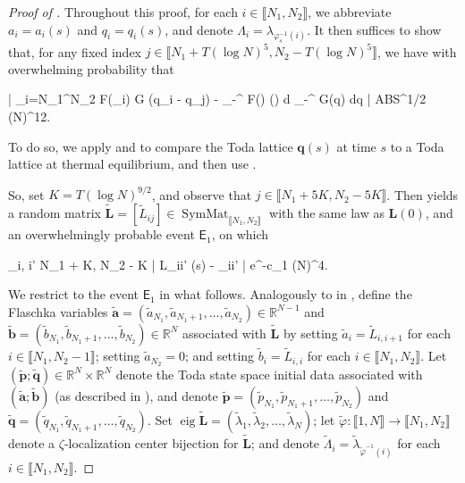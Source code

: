 \documentclass{amsart}
\numberwithin{equation}{section}
\DeclareMathOperator{\eig}{eig}
\DeclareMathOperator{\SymMat}{SymMat}
\theoremstyle{remark}
\theoremstyle{definition}
\begin{document}
	
	\begin{proof}[Proof of ]
		
		Throughout this proof, for each $i \in \llbracket N_1, N_2 \rrbracket$, we abbreviate $a_i = a_i (s)$ and $q_i = q_i (s)$, and denote $\Lambda_i = \lambda_{\varphi_s^{-1} (i)}$. It then suffices to show that, for any fixed index $j \in \llbracket N_1 + T (\log N)^5, N_2 - T (\log N)^5 \rrbracket$, we have with overwhelming probability that  
		\begin{flalign}
			\label{lambdai2} 
			\Bigg| \displaystyle\sum_{i=N_1}^{N_2} F(\Lambda_i) \cdot G (q_i - q_j) - \displaystyle\int_{-\infty}^{\infty} F(\lambda) \varrho (\lambda) d \lambda \displaystyle\int_{-\infty}^{\infty} G(\alpha q) dq \Bigg| \le ABS^{1/2} (\log N)^{12}.
		\end{flalign}
		
		\noindent To do so, we apply  and  to compare the Toda lattice $\bm{q}(s)$ at time $s$ to a Toda lattice at thermal equilibrium, and then use \Cref{concentrationhs0}. 
		
		So, set $K = T (\log N)^{9/2}$, and observe that $j \in \llbracket N_1 + 5K, N_2 - 5K \rrbracket$. Then  yields a random matrix $\tilde{\bm{L}} = [\tilde{L}_{ij}] \in \SymMat_{\llbracket N_1, N_2 \rrbracket}$ with the same law as $\bm{L}(0)$, and an overwhelmingly probable event $\mathsf{E}_1$, on which 
		\begin{flalign}
			\label{l2ij} 
			\displaystyle\max_{i, i' \in \llbracket N_1 + K, N_2 - K \rrbracket} | L_{ii'} (s) - _{ii'} | \le e^{-c_1 (\log N)^4}.
		\end{flalign}
		
		 We restrict to the event $\mathsf{E}_1$ in what follows. Analogously to in , define the Flaschka variables $\tilde{\bm{a}} = (\tilde{a}_{N_1}, \tilde{a}_{N_1+1}, \ldots , \tilde{a}_{N_2}) \in \mathbb{R}^{N-1}$ and $\tilde{\bm{b}} = (\tilde{b}_{N_1}, \tilde{b}_{N_1+1}, \ldots , \tilde{b}_{N_2}) \in \mathbb{R}^N$ associated with $\tilde{\bm{L}}$ by setting $\tilde{a}_i = \tilde{L}_{i,i+1}$ for each $i \in \llbracket N_1, N_2-1 \rrbracket$; setting $\tilde{a}_{N_2} = 0$; and setting $\tilde{b}_i = \tilde{L}_{i,i}$ for each $i \in \llbracket N_1, N_2 \rrbracket$. Let $(\tilde{\bm{p}}; \tilde{\bm{q}}) \in \mathbb{R}^N \times \mathbb{R}^N$ denote the Toda state space initial data associated with $(\tilde{\bm{a}}; \tilde{\bm{b}})$ (as described in ), and denote $\tilde{\bm{p}} = (\tilde{p}_{N_1}, \tilde{p}_{N_1+1}, \ldots , \tilde{p}_{N_2})$ and $\tilde{\bm{q}} = (\tilde{q}_{N_1}, \tilde{q}_{N_1+1}, \ldots , \tilde{q}_{N_2})$. Set $\eig \tilde{\bm{L}} = (\tilde{\lambda}_1, \tilde{\lambda}_2, \ldots , \tilde{\lambda}_N)$; let $\tilde{\varphi} : \llbracket 1, N \rrbracket \rightarrow \llbracket N_1, N_2 \rrbracket$ denote a $\zeta$-localization center bijection for $\tilde{\bm{L}}$; and denote $\tilde{\Lambda}_i = \tilde{\lambda}_{\tilde{\varphi}^{-1} (i)}$ for each $i \in \llbracket N_1, N_2 \rrbracket$. 
		

\end{proof}
\end{document}
